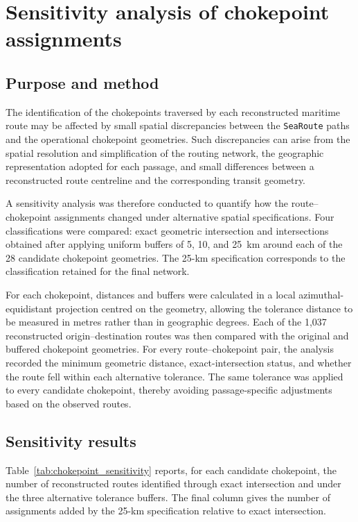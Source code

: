 \documentclass[pdftex,12pt,openright,a4paper,oneside]{book}
\begin{document}
\chapter{Sensitivity analysis of chokepoint assignments}
\label{app:chokepoint_sensitivity}

\section{Purpose and method}

The identification of the chokepoints traversed by each reconstructed maritime
route may be affected by small spatial discrepancies between the
\texttt{SeaRoute} paths and the operational chokepoint geometries. Such
discrepancies can arise from the spatial resolution and simplification of the
routing network, the geographic representation adopted for each passage, and
small differences between a reconstructed route centreline and the
corresponding transit geometry.

A sensitivity analysis was therefore conducted to quantify how the
route--chokepoint assignments changed under alternative spatial specifications. Four classifications were compared: exact geometric
intersection and intersections obtained after applying uniform buffers of 5,
10, and 25~km around each of the 28 candidate chokepoint geometries. The
25-km specification corresponds to the classification retained for the final
network.

For each chokepoint, distances and buffers were calculated in a local
azimuthal-equidistant projection centred on the geometry, allowing the tolerance distance to be measured in metres rather than in geographic degrees. 
Each of the 1,037 reconstructed origin--destination routes
was then compared with the original and buffered chokepoint geometries. For
every route--chokepoint pair, the analysis recorded the minimum geometric
distance, exact-intersection status, and whether the route fell within each
alternative tolerance. The same tolerance was applied to every candidate
chokepoint, thereby avoiding passage-specific adjustments based on the
observed routes.

\section{Sensitivity results}

Table~\ref{tab:chokepoint_sensitivity} reports, for each candidate
chokepoint, the number of reconstructed routes identified through exact
intersection and under the three alternative tolerance buffers. The final
column gives the number of assignments added by the 25-km specification
relative to exact intersection.
\end{document}
